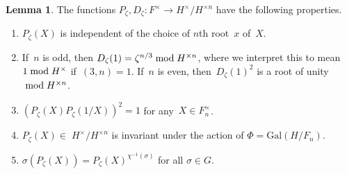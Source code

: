 \documentclass[12pt,reqno]{amsart}
\theoremstyle{definition}
\newtheorem{lemma}[theorem]{Lemma}
\newcommand{\changed}[1]{{#1}}
\newcommand{\frankchanged}[1]{{#1}}
\def\mod{\;\text{\rm mod}\;}
\def\s{\sigma} \def\a{\alpha}  \def\g{\gamma}   \def\z{\zeta}  \def\i{^{-1}}
\def\nn{n}
\def\Gal{\mathrm{Gal}}
\begin{document}
\begin{lemma} 
\label{lem.Rz} 
The functions $P_\z, D_{\z}:F^\times\to H^\times/H^{\times \nn}$ have the following 
properties.
\begin{enumerate}[label=(\alph*)]
\item \label{parta.Rz}
$P_\z(X)$ is independent of the choice of $\nn$th root~$x$ of~$X$.
\item \label{partb.Rz}
\frankchanged{If~$n$ is odd, then $D_\z(1)= \zeta^{n/3} \mod H^{\times n}$,
where we interpret this to mean~$1 \mod H^{\times}$ if~$(3,n) = 1$.}
 \changed{
If~$n$ is even, then~$D_{\z}(1)^2$ is a root of unity~$\mod H^{\times n}$.}
\item \label{partc.Rz}
 $(P_\z(X)P_\z(1/X))^2=1$ for any~$X\in F_n^\times$.
\item \label{partd.Rz}
$P_\z(X)\in\;H^\times/H^{\times \nn}$ is invariant
under the action of $\Phi=\Gal(H/F_\nn)$.
\item \label{parte.Rz}
$\s(P_\z(X)) = P_\z(X)^{\chi^{-1}(\sigma)}$ for all $\s\in G$.
\end{enumerate}
\end{lemma}
\end{document}
